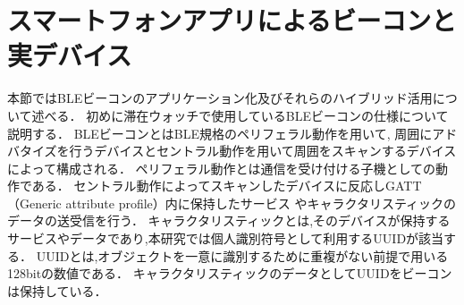  \clearpage
\section{スマートフォンアプリによるビーコンと実デバイス}\label{4.3}
本節ではBLEビーコンのアプリケーション化及びそれらのハイブリッド活用について述べる．
初めに滞在ウォッチで使用しているBLEビーコンの仕様について説明する．
BLEビーコンとはBLE規格のペリフェラル動作を用いて,
周囲にアドバタイズを行うデバイスとセントラル動作を用いて周囲をスキャンするデバイスによって構成される．
ペリフェラル動作とは通信を受け付ける子機としての動作である．
セントラル動作によってスキャンしたデバイスに反応しGATT（Generic attribute profile）内に保持したサービス
やキャラクタリスティックのデータの送受信を行う．
キャラクタリスティックとは,そのデバイスが保持するサービスやデータであり,本研究では個人識別符号として利用するUUIDが該当する．
UUIDとは,オブジェクトを一意に識別するために重複がない前提で用いる128bitの数値である．
キャラクタリスティックのデータとしてUUIDをビーコンは保持している．









